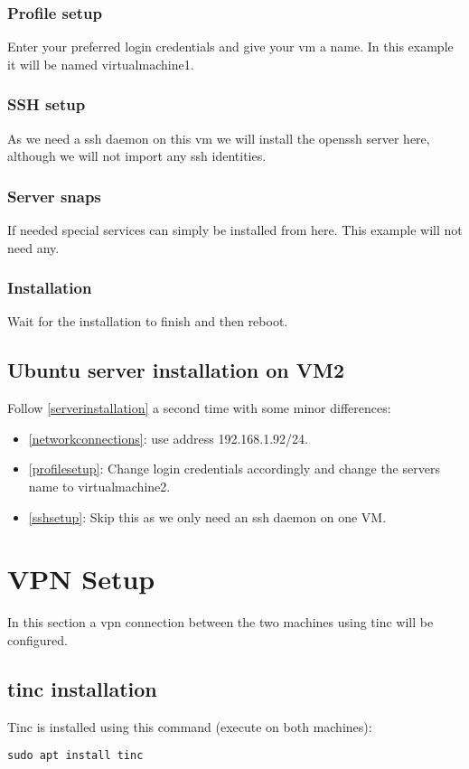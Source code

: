 \documentclass[10pt,a4paper]{article}
\begin{document}
\subsubsection{Profile setup}
\label{profilesetup}
Enter your preferred login credentials and give your vm a name. In this example it will be named virtualmachine1.

\subsubsection{SSH setup}
\label{sshsetup}
As we need a ssh daemon on this vm we will install the openssh server here, although we will not import any ssh identities.

\subsubsection{Server snaps}
If needed special services can simply be installed from here. This example will not need any.

\subsubsection{Installation}
Wait for the installation to finish and then reboot.

\subsection{Ubuntu server installation on VM2}
Follow \autoref{serverinstallation} a second time with some minor differences:
\begin{itemize}
\item \autoref{networkconnections}: use address 192.168.1.92/24.
\item \autoref{profilesetup}: Change login credentials accordingly and change the servers name to virtualmachine2.
\item \autoref{sshsetup}: Skip this as we only need an ssh daemon on one VM.
\end{itemize}

\newpage
\section{VPN Setup}
In this section a vpn connection between the two machines using tinc will be configured.

\subsection{tinc installation}
Tinc is installed using this command (execute on both machines):
\begin{verbatim}
sudo apt install tinc
\end{verbatim}
\end{document}
